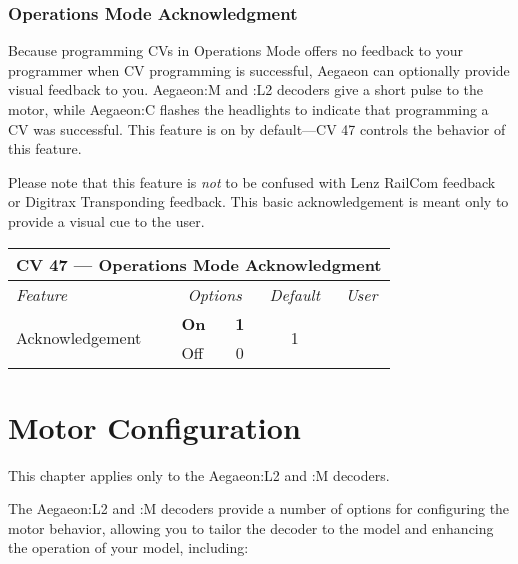\documentclass[12pt,letterpaper,draft]{memoir} %
\begin{document}
\subsection{Operations Mode Acknowledgment}
Because programming CVs in Operations Mode offers no feedback to your programmer when CV programming is successful, Aegaeon can optionally provide visual feedback to you. Aegaeon:M and :L2 decoders give a short pulse to the motor, while Aegaeon:C flashes the headlights to indicate that programming a CV was successful. This feature is on by default---CV 47 controls the behavior of this feature.

Please note that this feature is \textit{not} to be confused with Lenz RailCom\textsuperscript{\textregistered}  feedback or Digitrax Transponding feedback. This basic acknowledgement is meant only to provide a visual cue to the user.

\label{CV47}
\begin{center}
\begin{tabular}{|l|lc|c|c|}
\hline
\multicolumn{5}{|c|}{\textbf{CV 47 --- Operations Mode Acknowledgment}} \\ \hline \hline
\textit{Feature} & \multicolumn{2}{c|}{\textit{Options}} & \textit{Default} & \textit{User} \\ \hline
\multirow{2}{*}{Acknowledgement} & \textbf{On}	 & \textbf{1} & \multirow{2}{*}{1} &\\
													& Off & 0 & & \\ \hline
\end{tabular}
\end{center}



\chapter{Motor Configuration}
\label{motorconfiguration}
This chapter applies only to the Aegaeon:L2 and :M decoders.

The Aegaeon:L2 and :M decoders provide a number of options for configuring the motor behavior, allowing you to tailor the decoder to the model and enhancing the operation of your model, including:
\end{document}
